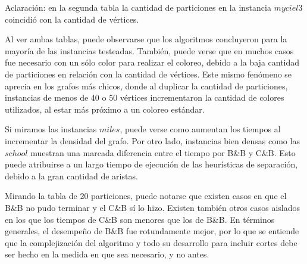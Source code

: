 Aclaración: en la segunda tabla la cantidad de particiones en la instancia $myciel3$ coincidió con la cantidad de vértices.

Al ver ambas tablas, puede observarse que los algoritmos concluyeron para la mayoría de las instancias testeadas. También, puede verse que en muchos casos fue necesario con un sólo color para realizar el coloreo, debido a la baja cantidad de particiones en relación con la cantidad de vértices. Este mismo fenómeno se aprecia en los grafos más chicos, donde al duplicar la cantidad de particiones, instancias de menos de 40 o 50 vértices incrementaron la cantidad de colores utilizados, al estar más próximo a un coloreo estándar.

Si miramos las instancias $miles$, puede verse como aumentan los tiempos al incrementar la densidad del grafo. Por otro lado, instancias bien densas como las $school$ muestran una marcada diferencia entre el tiempo por B\&B y C\&B. Esto puede atribuirse a un largo tiempo de ejecución de las heurísticas de separación, debido a la gran cantidad de aristas.

Mirando la tabla de 20 particiones, puede notarse que existen casos en que el B\&B no pudo terminar y el C\&B sí lo hizo. Existen también otros casos aislados en los que los tiempos de C\&B son menores que los de B\&B. En términos generales, el desempeño de B\&B fue rotundamente mejor, por lo que se entiende que la complejización del algoritmo y todo su desarrollo para incluir cortes debe ser hecho en la medida en que sea necesario, y no antes.




